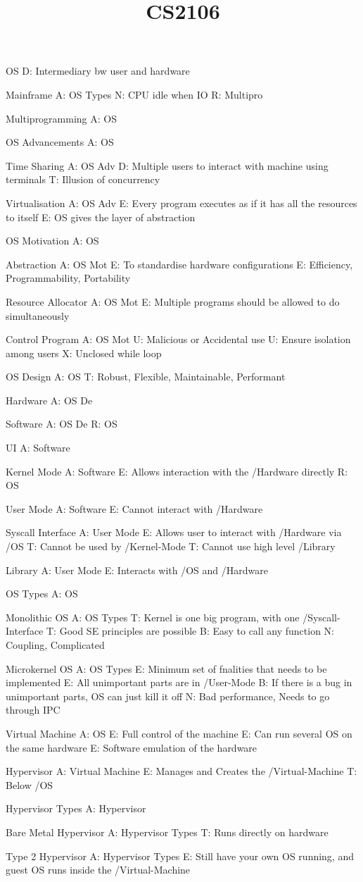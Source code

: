 \documentclass{article}
\begin{document}
\title{CS2106}

OS
D: Intermediary bw user and hardware

Mainframe
A: OS Types
N: CPU idle when IO
R: Multipro

Multiprogramming
A: OS

OS Advancements
A: OS

Time Sharing
A: OS Adv
D: Multiple users to interact with machine using terminals
T: Illusion of concurrency

Virtualisation
A: OS Adv
E: Every program executes as if it has all the resources to itself
E: OS gives the layer of abstraction

OS Motivation
A: OS

Abstraction
A: OS Mot
E: To standardise hardware configurations
E: Efficiency, Programmability, Portability

Resource Allocator
A: OS Mot
E: Multiple programs should be allowed to do simultaneously

Control Program
A: OS Mot
U: Malicious or Accidental use
U: Ensure isolation among users
X: Unclosed while loop

OS Design
A: OS
T: Robust, Flexible, Maintainable, Performant

Hardware
A: OS De

Software
A: OS De
R: OS

UI
A: Software

Kernel Mode
A: Software
E: Allows interaction with the /Hardware directly
R: OS

User Mode
A: Software
E: Cannot interact with /Hardware

Syscall Interface
A: User Mode
E: Allows user to interact with /Hardware via /OS
T: Cannot be used by /Kernel-Mode
T: Cannot use high level /Library

Library
A: User Mode
E: Interacts with /OS and /Hardware

OS Types
A: OS

Monolithic OS
A: OS Types
T: Kernel is one big program, with one /Syscall-Interface
T: Good SE principles are possible
B: Easy to call any function
N: Coupling, Complicated

Microkernel OS
A: OS Types
E: Minimum set of fnalities that needs to be implemented
E: All unimportant parts are in /User-Mode
B: If there is a bug in unimportant parts, OS can just kill it off
N: Bad performance, Needs to go through IPC

Virtual Machine
A: OS
E: Full control of the machine
E: Can run several OS on the same hardware
E: Software emulation of the hardware

Hypervisor
A: Virtual Machine
E: Manages and Creates the /Virtual-Machine
T: Below /OS

Hypervisor Types
A: Hypervisor

Bare Metal Hypervisor
A: Hypervisor Types
T: Runs directly on hardware

Type 2 Hypervisor
A: Hypervisor Types
E: Still have your own OS running, and guest OS runs inside the /Virtual-Machine
\end{document}

